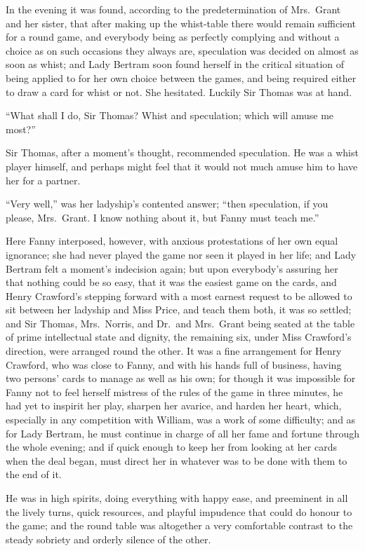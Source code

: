 In the evening it was found, according to the predetermination
of Mrs.\ Grant and her sister, that after making up
the whist-table there would remain sufficient for a
round game, and everybody being as perfectly complying
and without a choice as on such occasions they always are,
speculation was decided on almost as soon as whist;
and Lady Bertram soon found herself in the critical situation
of being applied to for her own choice between the games,
and being required either to draw a card for whist or not.
She hesitated.  Luckily Sir Thomas was at hand.

``What shall I do, Sir Thomas?  Whist and speculation;
which will amuse me most?''

Sir Thomas, after a moment's thought, recommended speculation.
He was a whist player himself, and perhaps might feel
that it would not much amuse him to have her for a partner.

``Very well,'' was her ladyship's contented answer;
``then speculation, if you please, Mrs.\ Grant.  I know
nothing about it, but Fanny must teach me.''

Here Fanny interposed, however, with anxious protestations
of her own equal ignorance; she had never played the
game nor seen it played in her life; and Lady Bertram
felt a moment's indecision again; but upon everybody's
assuring her that nothing could be so easy, that it
was the easiest game on the cards, and Henry Crawford's
stepping forward with a most earnest request to be allowed
to sit between her ladyship and Miss Price, and teach
them both, it was so settled; and Sir Thomas, Mrs.\ Norris,
and Dr.\ and Mrs.\ Grant being seated at the table of prime
intellectual state and dignity, the remaining six,
under Miss Crawford's direction, were arranged round
the other.  It was a fine arrangement for Henry Crawford,
who was close to Fanny, and with his hands full of business,
having two persons' cards to manage as well as his own;
for though it was impossible for Fanny not to feel herself
mistress of the rules of the game in three minutes,
he had yet to inspirit her play, sharpen her avarice,
and harden her heart, which, especially in any competition
with William, was a work of some difficulty; and as for
Lady Bertram, he must continue in charge of all her fame
and fortune through the whole evening; and if quick enough
to keep her from looking at her cards when the deal began,
must direct her in whatever was to be done with them
to the end of it.

He was in high spirits, doing everything with happy ease,
and preeminent in all the lively turns, quick resources,
and playful impudence that could do honour to the game;
and the round table was altogether a very comfortable
contrast to the steady sobriety and orderly silence of
the other.


